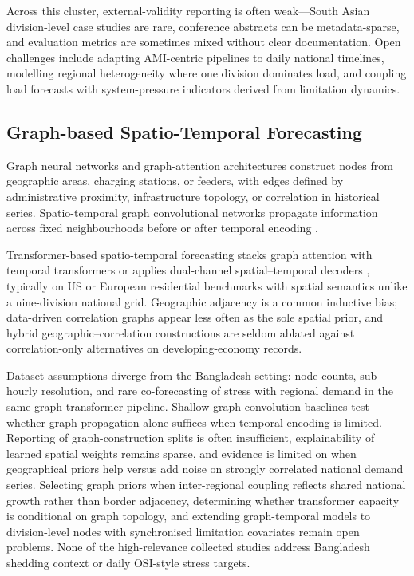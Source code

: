 Across this cluster, external-validity reporting is often weak---South Asian division-level case studies are rare, conference abstracts can be metadata-sparse, and evaluation metrics are sometimes mixed without clear documentation. Open challenges include adapting AMI-centric pipelines to daily national timelines, modelling regional heterogeneity where one division dominates load, and coupling load forecasts with system-pressure indicators derived from limitation dynamics.

\subsection{Graph-based Spatio-Temporal Forecasting}\label{subsection:graph_based_spatio_temporal_forecasting}

Graph neural networks and graph-attention architectures \cite{Kipf2017GCN,Sun2024GLFN} construct nodes from geographic areas, charging stations, or feeders, with edges defined by administrative proximity, infrastructure topology, or correlation in historical series. Spatio-temporal graph convolutional networks propagate information across fixed neighbourhoods before or after temporal encoding \cite{Shi2024EVChargingGNN,Zhuang2024MultiScaleGNN,Wu2023TransferLearningGNN}.

Transformer-based spatio-temporal forecasting stacks graph attention with temporal transformers or applies dual-channel spatial--temporal decoders \cite{Zhao2024GraphAttentionTransformer,Bentsen2023GraphTransformer,Vaswani2017Attention}, typically on US or European residential benchmarks with spatial semantics unlike a nine-division national grid. Geographic adjacency is a common inductive bias; data-driven correlation graphs appear less often as the sole spatial prior, and hybrid geographic--correlation constructions are seldom ablated against correlation-only alternatives on developing-economy records.

Dataset assumptions diverge from the Bangladesh setting: node counts, sub-hourly resolution, and rare co-forecasting of stress with regional demand in the same graph-transformer pipeline. Shallow graph-convolution baselines \cite{Yu2018STGCN,Zhao2020TGCN} test whether graph propagation alone suffices when temporal encoding is limited. Reporting of graph-construction splits is often insufficient, explainability of learned spatial weights remains sparse, and evidence is limited on when geographical priors help versus add noise on strongly correlated national demand series. Selecting graph priors when inter-regional coupling reflects shared national growth rather than border adjacency, determining whether transformer capacity is conditional on graph topology, and extending graph-temporal models to division-level nodes with synchronised limitation covariates remain open problems. None of the high-relevance collected studies address Bangladesh shedding context or daily OSI-style stress targets.

